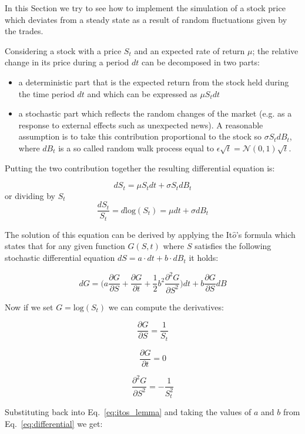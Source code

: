 In this Section we try to see how to implement the simulation of a stock price which deviates from a steady state as a result of random fluctuations given by the trades. 

Considering a stock with a price \(S_t\) and an expected rate of return \(\mu\); the relative change in its price during a period \(dt\) can be decomposed in two parts:

\begin{itemize}
\tightlist
\item
  a deterministic part that is the expected return from the stock held
  during the time period \(dt\) and which can be expressed as \(\mu S_tdt\)
\item
  a stochastic part which reflects the random changes of the market
  (e.g. as a response to external effects such as unexpected news). A
  reasonable assumption is to take this contribution proportional to the
  stock so \(\sigma S_t dB_t\), where \(dB_t\) is a so called random walk process equal to \(\epsilon\sqrt{t}=\mathcal{N}(0,1)\sqrt{t}\).
\end{itemize}
Putting the two contribution together the resulting differential equation is:

\begin{equation}
  dS_t = \mu S_tdt + \sigma S_tdB_t
  \label{eq:differential}
\end{equation}
or dividing by $S_t$
\[\frac{dS_t}{S_t} = d\textrm{log}(S_t) = \mu dt + \sigma dB_t\]

    The solution of this equation can be derived by applying the
It\(\hat{o}\)'s formula which states that for any given function
\(G(S, t)\) where \(S\) satisfies the following stochastic differential
equation \(dS=a\cdot dt +b\cdot dB_t\) it holds:

\begin{equation}
dG=\big(a\frac{\partial G}{\partial S} + \frac{\partial G}{\partial t} + \frac{1}{2}b^2\frac{\partial^2 G}{\partial S^2} \big)dt + b \frac{\partial G}{\partial S}dB
\label{eq:itos_lemma}
\end{equation}

Now if we set \(G = \textrm{log}(S_t)\) we can compute the derivatives:

\[\frac{\partial G}{\partial S} = \frac{1}{S_t}\]

\[\frac{\partial G}{\partial t} = 0\]

\[\frac{\partial^2 G}{\partial S^2} = -\frac{1}{S_t^{2}}\]

Substituting back into Eq.~\ref{eq:itos_lemma} and taking the values of $a$ and $b$ from Eq.~\ref{eq:differential} we get:

